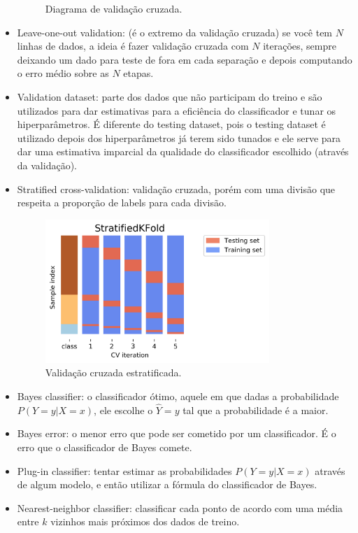 \documentclass[a4paper,fleqn,12pt]{article}
\begin{document}
\begin{itemize}
\begin{figure}[H]
\caption{Diagrama de validação cruzada.}
\label{fig:crossval}
\end{figure}
\item Leave-one-out validation: (é o extremo da validação cruzada) se você tem $N$ linhas de dados, a ideia é fazer validação cruzada com $N$ iterações, sempre deixando um dado para teste de fora em cada separação e depois computando o erro médio sobre as $N$ etapas.
\item Validation dataset: parte dos dados que não participam do treino e são utilizados para dar estimativas para a eficiência do classificador e tunar os hiperparâmetros. É diferente do testing dataset, pois o testing dataset é utilizado depois dos hiperparâmetros já terem sido tunados e ele serve para dar uma estimativa imparcial da qualidade do classificador escolhido (através da validação).
\item Stratified cross-validation: validação cruzada, porém com uma divisão que respeita a proporção de labels para cada divisão.
\begin{figure}[H]
\centering
\includegraphics[width=0.8\textwidth]{fig/strcrossval.png}
\caption{Validação cruzada estratificada.}
\label{fig:strcrossval}
\end{figure}
\item Bayes classifier: o classificador ótimo, aquele em que dadas a probabilidade $P(Y = y | X=x)$, ele escolhe o $\hat{Y}=y$ tal que a probabilidade é a maior.
\item Bayes error: o menor erro que pode ser cometido por um classificador. É o erro que o classificador de Bayes comete.
\item Plug-in classifier: tentar estimar as probabilidades $P(Y=y | X=x)$ através de algum modelo, e então utilizar a fórmula do classificador de Bayes.
\item Nearest-neighbor classifier: classificar cada ponto de acordo com uma média entre $k$ vizinhos mais próximos dos dados de treino.

\end{itemize}
\end{document}
